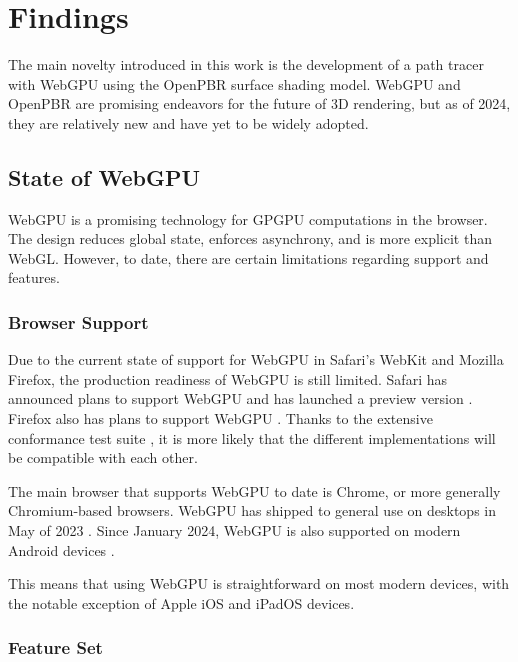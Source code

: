 \section{Findings}

The main novelty introduced in this work is the development of a path tracer with \gls{WebGPU} using the \gls{OpenPBR} surface shading model. \gls{WebGPU} and \gls{OpenPBR} are promising endeavors for the future of 3D rendering, but as of 2024, they are relatively new and have yet to be widely adopted.

\subsection*{State of WebGPU}

\gls{WebGPU} is a promising technology for \gls{GPGPU} computations in the browser. The design reduces global state, enforces asynchrony, and is more explicit than \gls{WebGL}. However, to date, there are certain limitations regarding support and features.

\subsubsection*{Browser Support}

Due to the current state of support for \gls{WebGPU} in Safari's \gls{WebKit} and Mozilla Firefox, the production readiness of \gls{WebGPU} is still limited. Safari has announced plans to support \gls{WebGPU} and has launched a preview version \cite{SafariWebGPUSupport}. Firefox also has plans to support WebGPU \cite{FirefoxWebGPUSupport}. Thanks to the extensive conformance test suite \cite{WebGPUConformanceTestSuite}, it is more likely that the different implementations will be compatible with each other.

The main browser that supports \gls{WebGPU} to date is Chrome, or more generally \gls{Chromium}-based browsers. \gls{WebGPU} has shipped to general use on desktops in May of 2023 \cite{ChromeWebGPUSupport}. Since January 2024, \gls{WebGPU} is also supported on modern Android devices \cite{ChromeAndroidWebGPUSupport}.

This means that using \gls{WebGPU} is straightforward on most modern devices, with the notable exception of Apple iOS and iPadOS devices.

\subsubsection*{Feature Set}

